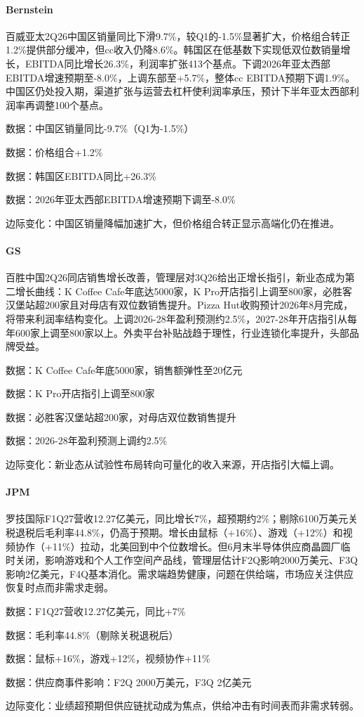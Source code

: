 \documentclass[11pt]{ctexart}
\begin{document}
\paragraph{Bernstein} 百威亚太2Q26中国区销量同比下滑9.7\%，较Q1的-1.5\%显著扩大，价格组合转正1.2\%提供部分缓冲，但cc收入仍降8.6\%。韩国区在低基数下实现低双位数销量增长，EBITDA同比增长26.3\%，利润率扩张413个基点。下调2026年亚太西部EBITDA增速预期至-8.0\%，上调东部至+5.7\%，整体cc EBITDA预期下调1.9\%。中国区仍处投入期，渠道扩张与运营去杠杆使利润率承压，预计下半年亚太西部利润率再调整100个基点。
{\small\color{refgray}数据：中国区销量同比-9.7\%（Q1为-1.5\%）\par}
{\small\color{refgray}数据：价格组合+1.2\%\par}
{\small\color{refgray}数据：韩国区EBITDA同比+26.3\%\par}
{\small\color{refgray}数据：2026年亚太西部EBITDA增速预期下调至-8.0\%\par}
{\small\color{refgray}边际变化：中国区销量降幅加速扩大，但价格组合转正显示高端化仍在推进。\par}
\paragraph{GS} 百胜中国2Q26同店销售增长改善，管理层对3Q26给出正增长指引，新业态成为第二增长曲线：K Coffee Cafe年底达5000家，K Pro开店指引上调至800家，必胜客汉堡站超200家且对母店有双位数销售提升。Pizza Hut收购预计2026年8月完成，将带来利润率结构变化。上调2026-28年盈利预测约2.5\%，2027-28年开店指引从每年600家上调至800家以上。外卖平台补贴战趋于理性，行业连锁化率提升，头部品牌受益。
{\small\color{refgray}数据：K Coffee Cafe年底5000家，销售额弹性至20亿元\par}
{\small\color{refgray}数据：K Pro开店指引上调至800家\par}
{\small\color{refgray}数据：必胜客汉堡站超200家，对母店双位数销售提升\par}
{\small\color{refgray}数据：2026-28年盈利预测上调约2.5\%\par}
{\small\color{refgray}边际变化：新业态从试验性布局转向可量化的收入来源，开店指引大幅上调。\par}
\paragraph{JPM} 罗技国际F1Q27营收12.27亿美元，同比增长7\%，超预期约2\%；剔除6100万美元关税退税后毛利率44.8\%，仍高于预期。增长由鼠标（+16\%）、游戏（+12\%）和视频协作（+11\%）拉动，北美回到中个位数增长。但6月末半导体供应商晶圆厂临时关闭，影响游戏和个人工作空间产品线，管理层估计F2Q影响2000万美元、F3Q影响2亿美元，F4Q基本消化。需求端趋势健康，问题在供给端，市场应关注供应恢复时点而非需求走弱。
{\small\color{refgray}数据：F1Q27营收12.27亿美元，同比+7\%\par}
{\small\color{refgray}数据：毛利率44.8\%（剔除关税退税后）\par}
{\small\color{refgray}数据：鼠标+16\%，游戏+12\%，视频协作+11\%\par}
{\small\color{refgray}数据：供应商事件影响：F2Q 2000万美元，F3Q 2亿美元\par}
{\small\color{refgray}边际变化：业绩超预期但供应链扰动成为焦点，供给冲击有时间表而非需求转弱。\par}
\end{document}
